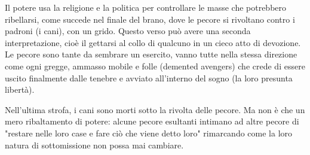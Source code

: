 \documentclass[class=book, crop=false, oneside, 12pt]{standalone}
\begin{document}
    Il potere usa la religione e la politica per controllare le masse che potrebbero ribellarsi, come succede nel finale del brano, dove le pecore si rivoltano contro i padroni (i cani), con un grido. Questo verso può avere una seconda interpretazione, cioè il gettarsi al collo di qualcuno in un cieco atto di devozione. Le pecore sono tante da sembrare un esercito, vanno tutte nella stessa direzione come ogni gregge, ammasso mobile e folle (demented avengers) che crede di essere uscito finalmente dalle tenebre e avviato all'interno del sogno (la loro presunta libertà).

    Nell'ultima strofa, i cani sono morti sotto la rivolta delle pecore. Ma non è che un mero ribaltamento di potere: alcune pecore esultanti intimano ad altre pecore di "restare nelle loro case e fare ciò che viene detto loro" rimarcando come la loro natura di sottomissione non possa mai cambiare.
\end{document}
